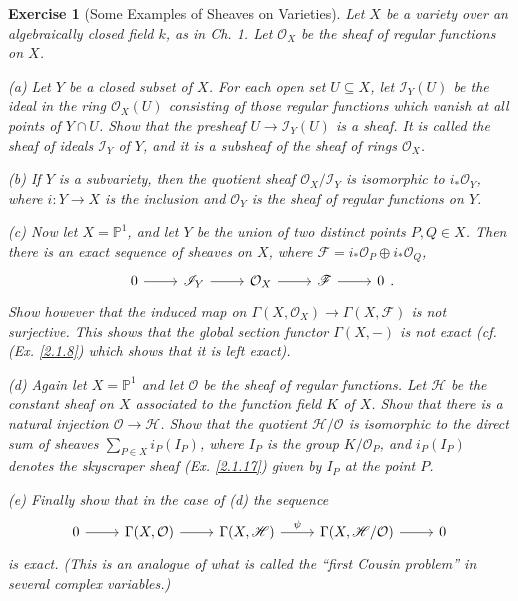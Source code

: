 \documentclass{amsart}
\newtheorem{exe}{Exercise}[subsection]
\theoremstyle{remark}\newtheorem{rmk}[theorem]{Remark}
\begin{document}
\begin{exe}[Some Examples of Sheaves on Varieties]
	\label{2.1.21}
	Let $X$ be a variety over an algebraically closed field $k$, as in \textup{Ch. 1}. Let $\mathcal{O}_X$ be the sheaf of regular functions on $X$.
	
	(a) Let $Y$ be a closed subset of $X$. For each open set $U\subseteq X$, let $\mathscr{I}_Y(U)$ be the ideal in the ring $\mathcal{O}_X(U)$ consisting of those regular functions which vanish at all points of $Y\cap U$. Show that the presheaf $U\to\mathscr{I}_Y(U)$ is a sheaf. It is called the \textup{sheaf of ideals} $\mathscr{I}_Y$ of $Y$, and it is a subsheaf of the sheaf of rings $\mathcal{O}_X$.
	
	(b) If $Y$ is a subvariety, then the quotient sheaf $\mathcal{O}_X/\mathscr{I}_Y$ is isomorphic to $i_*\mathcal{O}_Y$, where $i:Y\to X$ is the inclusion and $\mathcal{O}_Y$ is the sheaf of regular functions on $Y$.
	
	(c) Now let $X=\mathbb{P}^1$, and let $Y$ be the union of two distinct points $P,Q\in X$. Then there is an exact sequence of sheaves on $X$, where $\mathscr{F}=i_*\mathcal{O}_P\oplus i_*\mathcal{O}_Q$,
	\begin{equation*}
		\begin{tikzcd}
			0 \arrow[r] & \mathscr{I}_Y \arrow[r] & \mathcal{O}_X \arrow[r] & \mathscr{F} \arrow[r] & 0
		\end{tikzcd}.
	\end{equation*}
	Show however that the induced map on $\Gamma(X,\mathcal{O}_X)\to\Gamma(X,\mathscr{F})$ is not surjective. This shows that the global section functor $\Gamma(X,-)$ is not exact \textup{(cf. (Ex. \ref{2.1.8}) which shows that it is left exact)}.
	
	(d) Again let $X=\mathbb{P}^1$ and let $\mathcal{O}$ be the sheaf of regular functions. Let $\mathscr{H}$ be the constant sheaf on $X$ associated to the function field $K$ of $X$. Show that there is a natural injection $\mathcal{O}\to\mathscr{H}$. Show that the quotient $\mathscr{H}/\mathcal{O}$ is isomorphic to the direct sum of sheaves $\sum_{P\in X}i_P(I_P)$, where $I_P$ is the group $K/\mathcal{O}_P$, and $i_P(I_P)$ denotes the skyscraper sheaf \textup{(Ex. \ref{2.1.17})} given by $I_P$ at the point $P$.
	
	(e) Finally show that in the case of (d) the sequence
	\begin{equation*}
		\begin{tikzcd}
			0 \arrow[r] & {\Gamma(X,\mathcal{O})} \arrow[r] & {\Gamma(X,\mathscr{H})} \arrow[r, "\psi"] & {\Gamma(X,\mathscr{H}/\mathcal{O})} \arrow[r] & 0
		\end{tikzcd}
	\end{equation*}
	is exact. \textup{(This is an analogue of what is called the ``first Cousin problem'' in several complex variables.)}
\end{exe}
\end{document}
